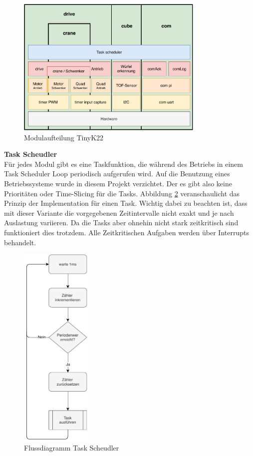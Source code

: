 \documentclass[../../main.tex]{subfiles}
\begin{document}
    \begin{figure}[H]
        \centering
        \includegraphics[width=0.8\textwidth]{../../images/et/et_mc_softwarekonzept.pdf}
        \caption {Modulaufteilung TinyK22}
        \label{fig:et_mc_softwarekonzept}
    \end{figure}

    \textbf{Task Scheudler}\\
    Für jedes Modul gibt es eine Taskfunktion, die während des Betriebs in einem Task Scheduler Loop periodisch aufgerufen wird. Auf die Benutzung eines Betriebssysteme wurde in diesem Projekt verzichtet. Der es gibt also keine Prioritäten oder Time-Slicing für die Tasks. Abbildung \ref{fig:et_task_scheudler} veranschaulicht das Prinzip der Implementation für einen Task. Wichtig dabei zu beachten ist, dass mit dieser Variante die vorgegebenen Zeitintervalle nicht exakt und je nach Auslastung variieren. Da die Tasks aber ohnehin nicht stark zeitkritisch sind funktioniert dies trotzdem. Alle Zeitkritischen Aufgaben werden über Interrupts behandelt.

    \begin{figure}[H]
        \centering
        \includegraphics[width=0.3\textwidth]{../../images/et/et_task_scheudler.pdf}
        \caption {Flussdiagramm Task Scheudler}
        \label{fig:et_task_scheudler}
    \end{figure}
\end{document}
